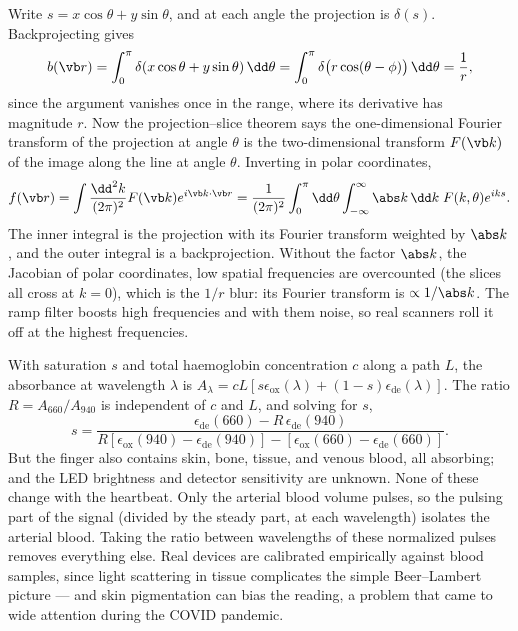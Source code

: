  Write $s = x\cos\theta + y\sin\theta$, and at each angle the projection is $\delta(s)$. Backprojecting gives
\[
  b(\vb r) = \int_0^\pi\delta(x\cos\theta + y\sin\theta)\,\dd\theta = \int_0^\pi\delta\big(r\cos(\theta-\phi)\big)\,\dd\theta = \frac1r,
\]
since the argument vanishes once in the range, where its derivative has magnitude $r$. Now the projection--slice theorem says the one-dimensional Fourier transform of the projection at angle $\theta$ is the two-dimensional transform $F(\vb k)$ of the image along the line at angle $\theta$. Inverting in polar coordinates,
\[
  f(\vb r) = \int\frac{\dd^2k}{(2\pi)^2}F(\vb k)e^{i\vb k\cdot\vb r} = \frac{1}{(2\pi)^2}\int_0^\pi\dd\theta\int_{-\infty}^\infty\abs k\,\dd k\;F(k,\theta)e^{iks}.
\]
The inner integral is the projection with its Fourier transform weighted by $\abs k$, and the outer integral is a backprojection. Without the factor $\abs k$, the Jacobian of polar coordinates, low spatial frequencies are overcounted (the slices all cross at $k = 0$), which is the $1/r$ blur: its Fourier transform is $\propto1/\abs k$. The ramp filter boosts high frequencies and with them noise, so real scanners roll it off at the highest frequencies.

 With saturation $s$ and total haemoglobin concentration $c$ along a path $L$, the absorbance at wavelength $\lambda$ is $A_\lambda = cL[s\epsilon_{\text{ox}}(\lambda) + (1-s)\epsilon_{\text{de}}(\lambda)]$. The ratio $R = A_{660}/A_{940}$ is independent of $c$ and $L$, and solving for $s$,
\[
  s = \frac{\epsilon_{\text{de}}(660) - R\,\epsilon_{\text{de}}(940)}{R[\epsilon_{\text{ox}}(940) - \epsilon_{\text{de}}(940)] - [\epsilon_{\text{ox}}(660) - \epsilon_{\text{de}}(660)]}.
\]
But the finger also contains skin, bone, tissue, and venous blood, all absorbing; and the LED brightness and detector sensitivity are unknown. None of these change with the heartbeat. Only the arterial blood volume pulses, so the pulsing part of the signal (divided by the steady part, at each wavelength) isolates the arterial blood. Taking the ratio between wavelengths of these normalized pulses removes everything else. Real devices are calibrated empirically against blood samples, since light scattering in tissue complicates the simple Beer--Lambert picture --- and skin pigmentation can bias the reading, a problem that came to wide attention during the COVID pandemic.
